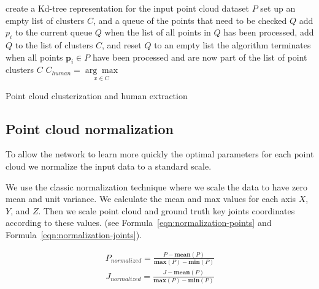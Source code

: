 \begin{algorithm}[H]
\label{alg:clusterization}
\SetAlgoLined
{}
 create a Kd-tree representation for the input point cloud dataset $P$ \;
 set up an empty list of clusters $C$, and a queue of the points that need to be checked $Q$ \;
 {
    add $p_i$ to the current queue $Q$ \;
    when the list of all points in $Q$ has been processed, add $Q$ to the list of clusters $C$, and reset $Q$ to an empty list \;
}
the algorithm terminates when all points $\boldsymbol{p}_i \in P$ have been processed and are now part of the list of point clusters $C$ \;
$C_{human} = \underset{ x \in C }{\arg\max}$

\caption{Point cloud clusterization and human extraction \parencite{noauthor_pcl_nodate}}
\end{algorithm}

\subsection{Point cloud normalization}

To allow the network to learn more quickly the optimal parameters for each point cloud we normalize the input data to a standard scale.

We use the classic normalization technique where we scale the data to have zero mean and unit variance. We calculate the mean and max values for each axis $X$, $Y$, and $Z$. Then we scale point cloud and ground truth key joints coordinates according to these values. (see Formula~\ref{eqn:normalization-points} and Formula~\ref{eqn:normalization-joints}).

\begin{equation}
    \begin{aligned}
        P_{normalized} = \frac{P - \textbf{mean}(P)}{\textbf{max}(P) - \textbf{min}(P)}
    \end{aligned}
\label{eqn:normalization-points}
\end{equation}
\begin{equation}
    \begin{aligned}
        J_{normalized} = \frac{J - \textbf{mean}(P)}{\textbf{max}(P) - \textbf{min}(P)}
    \end{aligned}
\label{eqn:normalization-joints}
\end{equation}

